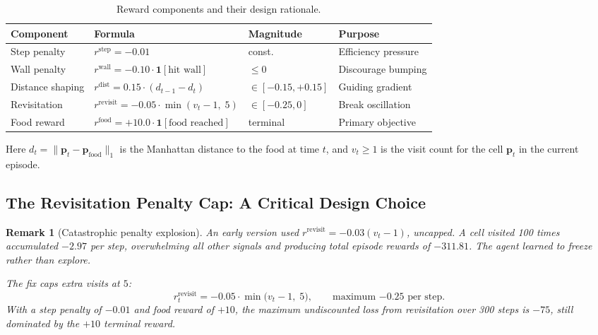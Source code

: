 \documentclass[11pt,a4paper]{article}
\newtheorem{remark}[theorem]{Remark}
\begin{document}
\begin{table}[h]
\centering
\caption{Reward components and their design rationale.}
\begin{tabular}{@{}llll@{}}
\toprule
Component & Formula & Magnitude & Purpose \\
\midrule
Step penalty & $r^{\text{step}} = -0.01$ & const. & Efficiency pressure \\
Wall penalty & $r^{\text{wall}} = -0.10 \cdot \mathbf{1}[\text{hit wall}]$ & $\le 0$ & Discourage bumping \\
Distance shaping & $r^{\text{dist}} = 0.15 \cdot (d_{t-1} - d_t)$ & $\in[-0.15, +0.15]$ & Guiding gradient \\
Revisitation & $r^{\text{revisit}} = -0.05 \cdot \min(v_t - 1,\; 5)$ & $\in[-0.25, 0]$ & Break oscillation \\
Food reward & $r^{\text{food}} = +10.0 \cdot \mathbf{1}[\text{food reached}]$ & terminal & Primary objective \\
\bottomrule
\end{tabular}
\label{tab:rewards}
\end{table}

Here $d_t = \|\mathbf{p}_t - \mathbf{p}_{\text{food}}\|_1$ is the Manhattan distance
to the food at time $t$, and $v_t \ge 1$ is the visit count for the cell
$\mathbf{p}_t$ in the current episode.

\subsection{The Revisitation Penalty Cap: A Critical Design Choice}

\begin{remark}[Catastrophic penalty explosion]
An early version used $r^{\text{revisit}} = -0.03(v_t - 1)$, \emph{uncapped}.
A cell visited 100 times accumulated $-2.97$ per step,
overwhelming all other signals and producing total episode rewards of $-311.81$.
The agent learned to freeze rather than explore.

The fix caps extra visits at $5$:
\begin{equation}
  r_t^{\text{revisit}} = -0.05 \cdot \min\bigl(v_t - 1,\; 5\bigr),
  \qquad \text{maximum } {-0.25 \text{ per step.}}
\end{equation}
With a step penalty of $-0.01$ and food reward of $+10$, the
maximum undiscounted loss from revisitation over 300 steps is $-75$,
still dominated by the $+10$ terminal reward.
\end{remark}
\end{document}
